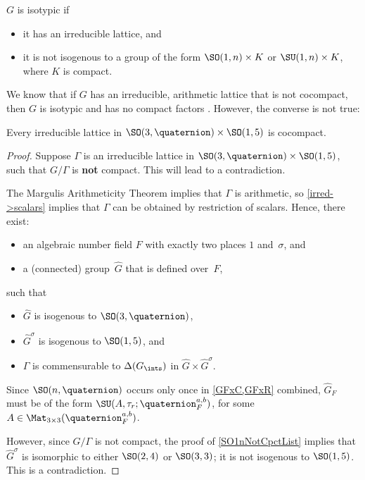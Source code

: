 \begin{cor}
$G$ is isotypic if 
	\begin{itemize}
	\item it has an irreducible lattice, 
	and 
	\item it is not isogenous to a group of the form $\SO(1,n) \times K$ or $\SU(1,n) \times K$, where $K$ is compact.
	\end{itemize}
\end{cor}

We know that if $G$ has an irreducible, arithmetic lattice that is not cocompact, then $G$ is isotypic  and has no compact factors . However, the converse is not true:


\begin{eg} \label{SO15xSO3H->Cocpct}
 Every irreducible lattice in $\SO(3,\quaternion) \times \SO(1,5)$ is cocompact.
 \end{eg}

\begin{proof}
 Suppose $\Gamma$ is an irreducible lattice in $\SO(3,\quaternion) \times \SO(1,5)$, such that $G/\Gamma$ is \textbf{not} compact. This will lead to a contradiction.

The Margulis Arithmeticity Theorem 
implies that $\Gamma$ is arithmetic, so
\cref{irred->scalars} implies that $\Gamma$ can be
obtained by restriction of scalars. Hence, there exist:
	\begin{itemize}
	\item an algebraic number field $F$ with exactly two places $1$ and~$\sigma$, 
	and
	\item a (connected) group~$\widehat G$ that is defined over~$F$,
 	\end{itemize}
such that 
	\begin{itemize}
	\item $\widehat G$ is isogenous to $\SO(3,\quaternion)$, 
	\item $\widehat G^\sigma$ is isogenous to $\SO(1,5)$,
	and
	\item $\Gamma$ is commensurable to $\Delta(G_{\ints})$ in $\widehat G \times \widehat G^\sigma$.
	\end{itemize}
Since $\SO(n,\quaternion)$ occurs only once in \cref{GFxC,GFxR} combined, $\widehat G_F$ must be of the form $\SU(A, \tau_r ; \quaternion^{a,b}_F)$, for some $A \in \Mat_{3 \times 3}( \quaternion^{a,b}_F )$.

However, since $G/\Gamma$ is not compact, the proof of \cref{SO1nNotCpctList} implies that $\widehat G^\sigma$ is isomorphic to either $\SO(2,4)$ or
$\SO(3,3)$; it is not isogenous to $\SO(1,5)$. This is a
contradiction.
 \end{proof}
 

